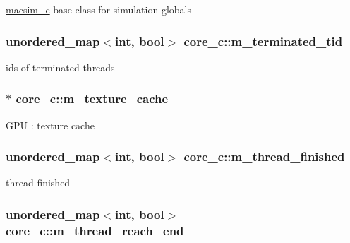 \label{classcore__c_a4bf560c9e3054151af77be43d8303134}
\hyperlink{classmacsim__c}{macsim\_\-c} base class for simulation globals \hypertarget{classcore__c_a38eff33d82cef74e85cbdf7988224b3f}{
\subsubsection[{m\_\-terminated\_\-tid}]{\setlength{\rightskip}{0pt plus 5cm}unordered\_\-map$<$int, bool$>$ {\bf core\_\-c::m\_\-terminated\_\-tid}}}
\label{classcore__c_a38eff33d82cef74e85cbdf7988224b3f}
ids of terminated threads \hypertarget{classcore__c_ab18e0b298c8ea8cc1fc28751cbd7bd1c}{
\subsubsection[{m\_\-texture\_\-cache}]{$\ast$ {\bf core\_\-c::m\_\-texture\_\-cache}}}
\label{classcore__c_ab18e0b298c8ea8cc1fc28751cbd7bd1c}
GPU : texture cache \hypertarget{classcore__c_a1884615499931477e72852d7cb13241d}{
\subsubsection[{m\_\-thread\_\-finished}]{\setlength{\rightskip}{0pt plus 5cm}unordered\_\-map$<$int, bool$>$ {\bf core\_\-c::m\_\-thread\_\-finished}}}
\label{classcore__c_a1884615499931477e72852d7cb13241d}
thread finished \hypertarget{classcore__c_a91a431d714f4e1872d994db0308ca801}{
\subsubsection[{m\_\-thread\_\-reach\_\-end}]{\setlength{\rightskip}{0pt plus 5cm}unordered\_\-map$<$int, bool$>$ {\bf core\_\-c::m\_\-thread\_\-reach\_\-end}}}

